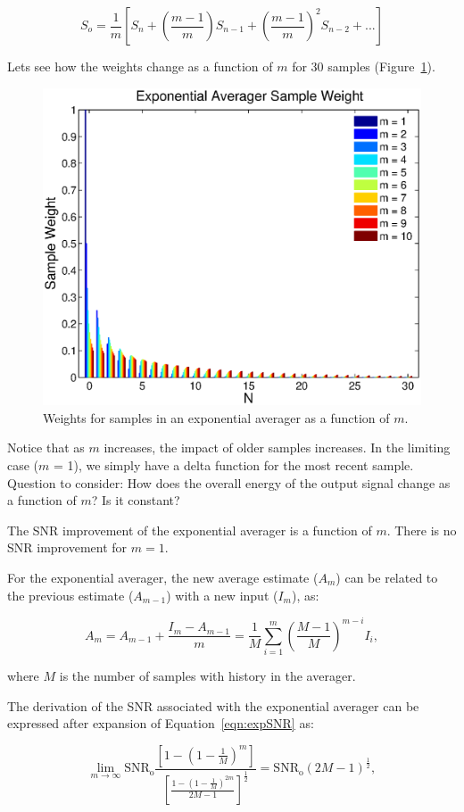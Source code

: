 

$$S_{o} = \frac{1}{m}\left[S_n + \left(\frac{m-1}{m}\right)S_{n-1}+\left(\frac{m-1}{m}\right)^2S_{n-2} + ...\right]$$

Lets see how the weights change as a function of $m$ for 30 samples (Figure~\ref{fig:exp_weight_ave}).

\begin{figure}[htb!]
\centering
\includegraphics[width=0.5\linewidth]{exp_weight_averager/exp_weight_ave.eps}
\caption{Weights for samples in an exponential averager as a function of $m$.}
\label{fig:exp_weight_ave}
\end{figure}

Notice that as $m$ increases, the impact of older samples increases.  In the
limiting case ($m$ = 1), we simply have a delta function for the most recent
sample.  Question to consider: How does the overall energy of the output signal
change as a function of $m$?  Is it constant?

The SNR improvement of the exponential averager is a function of $m$.  There is no SNR improvement for $m = 1$.

For the exponential averager, the new average estimate ($A_m$) can be related to the previous estimate ($A_{m-1}$) with a new input ($I_m$), as:

\begin{equation}
A_m = A_{m-1} + \frac{I_m - A_{m-1}}{m} = \frac{1}{M}\displaystyle\sum_{i=1}^m \left( \frac{M-1}{M}\right)^{m-i} I_i,
\label{eqn:expSNR}
\end{equation}

where $M$ is the number of samples with history in the averager.

The derivation of the SNR associated with the exponential averager can be expressed after expansion of Equation~\ref{eqn:expSNR} as:

\begin{equation}
\displaystyle\lim_{m \rightarrow \infty} \textrm{SNR}_\textrm{o} \frac{\left[ 1-(1-\frac{1}{M})^m \right]}{\left[ \frac{1-(1-\frac{1}{M})^{2m}}{2M-1}\right]^{\frac{1}{2}}} = \textrm{SNR}_\textrm{o} (2M-1)^{\frac{1}{2}},
\end{equation}

